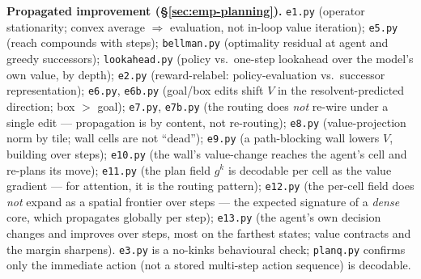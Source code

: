 \documentclass{article} %
\theoremstyle{plain}
\theoremstyle{definition}
\begin{document}
\textbf{Propagated improvement (\S\ref{sec:emp-planning}).}
\texttt{e1.py} (operator stationarity; convex average $\Rightarrow$ evaluation, not
in-loop value iteration); \texttt{e5.py} (reach compounds with steps);
\texttt{bellman.py} (optimality residual at agent and greedy successors);
\texttt{lookahead.py} (policy vs.\ one-step lookahead over the model's own value,
by depth); \texttt{e2.py} (reward-relabel: policy-evaluation vs.\ successor
representation); \texttt{e6.py}, \texttt{e6b.py} (goal/box edits shift $V$ in the
resolvent-predicted direction; box $>$ goal); \texttt{e7.py}, \texttt{e7b.py} (the
routing does \emph{not} re-wire under a single edit --- propagation is by content,
not re-routing); \texttt{e8.py} (value-projection norm by tile; wall cells are not
``dead''); \texttt{e9.py} (a path-blocking wall lowers $V$, building over steps);
\texttt{e10.py} (the wall's value-change reaches the agent's cell and re-plans its
move); \texttt{e11.py} (the plan field $g^{k}$ is decodable per cell as the value
gradient --- for attention, it is the routing pattern); \texttt{e12.py} (the
per-cell field does \emph{not} expand as a spatial frontier over steps --- the
expected signature of a \emph{dense} core, which propagates globally per step);
\texttt{e13.py} (the agent's own decision changes and improves over steps, most on
the farthest states; value contracts and the margin sharpens). \texttt{e3.py} is a
no-kinks behavioural check; \texttt{planq.py} confirms only the immediate action
(not a stored multi-step action sequence) is decodable.
\end{document}

